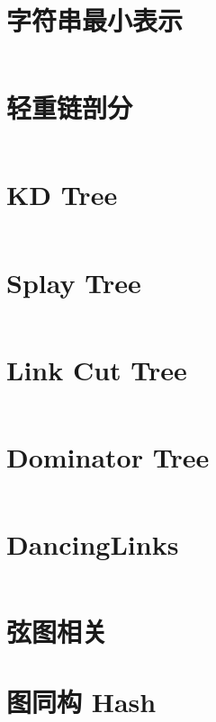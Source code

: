 \documentclass[titlepage,landscape,a4paper,10pt]{article}
\begin{document}
\begin{multicols}{2}
\begin{spacing}{0.8}
\section{字符串最小表示}
\inputminted{cpp}{src/字符串最小表示.cpp}

\section{轻重链剖分}
\inputminted{cpp}{src/轻重链剖分.cpp}

\section{KD Tree}
\inputminted{cpp}{src/KDTree.cpp}

\section{Splay Tree}
\inputminted{cpp}{src/Splay.cpp}

\section{Link Cut Tree}
\inputminted{cpp}{improve/LCT.cpp}

\section{Dominator Tree}
\inputminted{cpp}{improve/DominatorTree.cpp}

\section{DancingLinks}
\inputminted{cpp}{src/DancingLinks.cpp}
%

\section{弦图相关}


\section{图同构 Hash}




\end{spacing}
\end{multicols}
\end{document}
